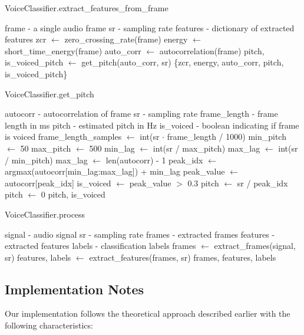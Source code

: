 \documentclass[10pt,journal,compsoc]{IEEEtran}
\begin{document}
\begin{algorithm}
\caption{VoiceClassifier.extract\_features\_from\_frame}
\begin{algorithmic}[1]
\REQUIRE frame - a single audio frame
\REQUIRE sr - sampling rate
\ENSURE features - dictionary of extracted features
\STATE zcr $\leftarrow$ zero\_crossing\_rate(frame)
\STATE energy $\leftarrow$ short\_time\_energy(frame)
\STATE auto\_corr $\leftarrow$ autocorrelation(frame)
\STATE pitch, is\_voiced\_pitch $\leftarrow$ get\_pitch(auto\_corr, sr)
\RETURN \{zcr, energy, auto\_corr, pitch, is\_voiced\_pitch\}
\end{algorithmic}
\end{algorithm}

\begin{algorithm}
\caption{VoiceClassifier.get\_pitch}
\begin{algorithmic}[1]
\REQUIRE autocorr - autocorrelation of frame
\REQUIRE sr - sampling rate
\REQUIRE frame\_length - frame length in ms
\ENSURE pitch - estimated pitch in Hz
\ENSURE is\_voiced - boolean indicating if frame is voiced
\STATE frame\_length\_samples $\leftarrow$ int(sr $\cdot$ frame\_length / 1000)
\STATE min\_pitch $\leftarrow$ 50 
\STATE max\_pitch $\leftarrow$ 500 
\STATE min\_lag $\leftarrow$ int(sr / max\_pitch)
\STATE max\_lag $\leftarrow$ int(sr / min\_pitch)
    \STATE max\_lag $\leftarrow$ len(autocorr) - 1
\ENDIF
\STATE peak\_idx $\leftarrow$ argmax(autocorr[min\_lag:max\_lag]) + min\_lag
\STATE peak\_value $\leftarrow$ autocorr[peak\_idx]
\STATE is\_voiced $\leftarrow$ peak\_value $>$ 0.3
    \STATE pitch $\leftarrow$ sr / peak\_idx
\ELSE
    \STATE pitch $\leftarrow$ 0
\ENDIF
\RETURN pitch, is\_voiced
\end{algorithmic}
\end{algorithm}

\begin{algorithm}
\caption{VoiceClassifier.process}
\begin{algorithmic}[1]
\REQUIRE signal - audio signal
\REQUIRE sr - sampling rate
\ENSURE frames - extracted frames
\ENSURE features - extracted features
\ENSURE labels - classification labels
\STATE frames $\leftarrow$ extract\_frames(signal, sr)
\STATE features, labels $\leftarrow$ extract\_features(frames, sr)
\RETURN frames, features, labels
\end{algorithmic}
\end{algorithm}

\subsection{Implementation Notes}
Our implementation follows the theoretical approach described earlier with the following characteristics:
\end{document}
